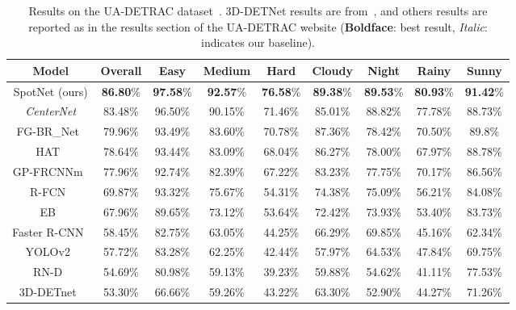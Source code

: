 \documentclass[10pt, conference, compsocconf]{IEEEtran}
\begin{document}
\begin{table*}[ht]
\footnotesize
\setlength\tabcolsep{3pt}
\def\arraystretch{1.5}
\centering
\caption{Results on the UA-DETRAC dataset~\cite{Wen2015Tracking}. 3D-DETNet results are from~\cite{3D_detnet_li20183d}, and others results are reported as in the results section of the UA-DETRAC website (\textbf{Boldface}: best result, \textit{Italic}: indicates our baseline).}
\label{resultsuadetrac}
\begin{tabular}{c|c|c|c|c|c|c|c|c}
Model & Overall & Easy & Medium & Hard & Cloudy & Night & Rainy & Sunny \\
\hline
\hline
SpotNet (ours) & \textbf{86.80}\% & \textbf{97.58}\% & \textbf{92.57}\% & \textbf{76.58}\% & \textbf{89.38}\% & \textbf{89.53}\% & \textbf{80.93}\% & \textbf{91.42}\% \\
\hline 
\textit{CenterNet}\cite{duan2019centernet} & 83.48\% & 96.50\% & 90.15\% & 71.46\% & 85.01\% & 88.82\% & 77.78\% & 88.73\% \\
\hline
FG-BR\_Net~\cite{fu2019foreground} & 79.96\% & 93.49\% & 83.60\% & 70.78\% & 87.36\% & 78.42\% & 70.50\% & 89.8\%\\
\hline 
HAT~\cite{wu2019hierarchical} & 78.64\% & 93.44\% & 83.09\% & 68.04\% & 86.27\% & 78.00\% & 67.97\% & 88.78\% \\
\hline
GP-FRCNNm~\cite{amin2017geometric} & 77.96\% & 92.74\% & 82.39\% & 67.22\% & 83.23\% & 77.75\% & 70.17\% & 86.56\% \\
\hline 
R-FCN~\cite{RFCN_NIPS2016_6465} & 69.87\% &    93.32\% &    75.67\% &    54.31\% &    74.38\% &    75.09\% &    56.21\% &    84.08\% \\
\hline
EB~\cite{EB_wang2017evolving} & 67.96\%    & 89.65\% &    73.12\% & 53.64\% & 72.42\% & 73.93\% & 53.40\% & 83.73\% \\
\hline 
Faster R-CNN~\cite{ren2015faster} & 58.45\% &    82.75\% &    63.05\% &    44.25\% &    66.29\% &    69.85\% &    45.16\% &    62.34\% \\
\hline 
YOLOv2~\cite{Redmon_2017_CVPR_YOLO2} & 57.72\% &    83.28\% &    62.25\% &    42.44\% &    57.97\% &    64.53\% &    47.84\% &    69.75\% \\
\hline 
RN-D~\cite{perreault2019road} & 54.69\% &    80.98\% &    59.13\% &    39.23\% &    59.88\% &    54.62\% &    41.11\% &    77.53\% \\
\hline 
3D-DETnet~\cite{3D_detnet_li20183d} & 53.30\% &    66.66\% &    59.26\% &    43.22\% &    63.30\% &    52.90\% &    44.27\% &    71.26\% \\
\end{tabular}
\vspace{-4mm}
\end{table*}
\end{document}
